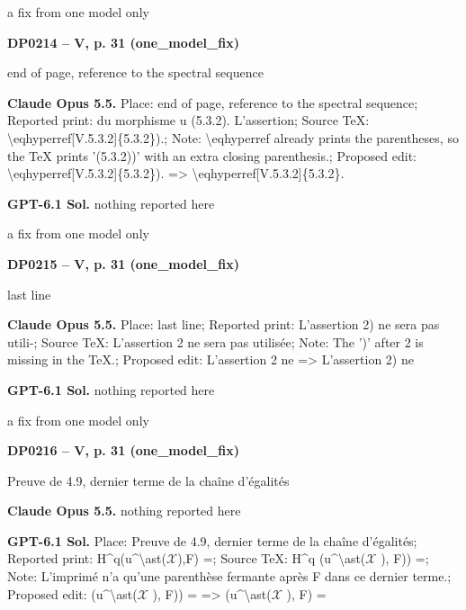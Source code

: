 a fix from one model only\par
\par\noindent\hypertarget{DP0214}{}\textbf{DP0214 -- V, p. 31 (one\_model\_fix)}\par
end of page, reference to the spectral sequence\par
\textbf{Claude Opus 5.5.} Place: end of page, reference to the spectral sequence; Reported print: du morphisme u (5.3.2). L'assertion; Source TeX: \textbackslash{}eqhyperref[V.5.3.2]\{5.3.2\}).; Note: \textbackslash{}eqhyperref already prints the parentheses, so the TeX prints '(5.3.2))' with an extra closing parenthesis.; Proposed edit: \textbackslash{}eqhyperref[V.5.3.2]\{5.3.2\}). =\allowbreak > \textbackslash{}eqhyperref[V.5.3.2]\{5.3.2\}.\par
\textbf{GPT-6.1 Sol.} nothing reported here\par
a fix from one model only\par
\par\noindent\hypertarget{DP0215}{}\textbf{DP0215 -- V, p. 31 (one\_model\_fix)}\par
last line\par
\textbf{Claude Opus 5.5.} Place: last line; Reported print: L'assertion 2) ne sera pas utili-; Source TeX: L'assertion 2 ne sera pas utilisée; Note: The ')' after 2 is missing in the TeX.; Proposed edit: L'assertion 2 ne =\allowbreak > L'assertion 2) ne\par
\textbf{GPT-6.1 Sol.} nothing reported here\par
a fix from one model only\par
\par\noindent\hypertarget{DP0216}{}\textbf{DP0216 -- V, p. 31 (one\_model\_fix)}\par
Preuve de 4.9, dernier terme de la chaîne d'égalités\par
\textbf{Claude Opus 5.5.} nothing reported here\par
\textbf{GPT-6.1 Sol.} Place: Preuve de 4.9, dernier terme de la chaîne d'égalités; Reported print: H\textasciicircum{}q(u\textasciicircum{}\textbackslash{}ast(\ensuremath{𝒳}),F) =; Source TeX: H\textasciicircum{}q (u\textasciicircum{}\textbackslash{}ast(\ensuremath{𝒳} ), F)) =; Note: L'imprimé n'a qu'une parenthèse fermante après F dans ce dernier terme.; Proposed edit: (u\textasciicircum{}\textbackslash{}ast(\ensuremath{𝒳} ), F)) = =\allowbreak > (u\textasciicircum{}\textbackslash{}ast(\ensuremath{𝒳} ), F) =\par
